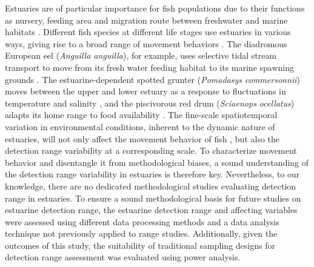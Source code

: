\documentclass[doublespacing,linenumbers]{bmcart}
\begin{document}
Estuaries are of particular importance for fish populations due to their functions as nursery, feeding area and migration route between freshwater and marine habitats \cite{Franco2008LifeApproach}. Different fish species at different life stages use estuaries in various ways, giving rise to a broad range of movement behaviors \cite{Potter2015TheApproach}. The diadromous European eel (\textit{Anguilla anguilla}), for example, uses selective tidal stream transport to move from its fresh water feeding habitat to its marine spawning grounds \cite{Verhelst2018}. The estuarine-dependent spotted grunter (\textit{Pomadasys commersonnii}) moves between the upper and lower estuary as a response to fluctuations in temperature and salinity \cite{Childs2008DoTelemetry}, and the piscivorous red drum (\textit{Sciaenops ocellatus}) adapts its home range to food availability \cite{Kenworthy2018MovementSeascape}. The fine-scale spatiotemporal variation in environmental conditions, inherent to the dynamic nature of estuaries, will not only affect the movement behavior of fish \cite{Childs2008DoTelemetry}, but also the detection range variability at a corresponding scale. To characterize movement behavior and disentangle it from methodological biases, a sound understanding of the detection range variability in estuaries is therefore key. Nevertheless, to our knowledge, there are no dedicated methodological studies evaluating detection range in estuaries. To ensure a sound methodological basis for future studies on estuarine detection range, the estuarine detection range and affecting variables were assessed using different data processing methods and a data analysis technique not previously applied to range studies. Additionally, given the outcomes  of this study, the suitability of traditional sampling designs for detection range assessment was evaluated using power analysis.  
\end{document}

